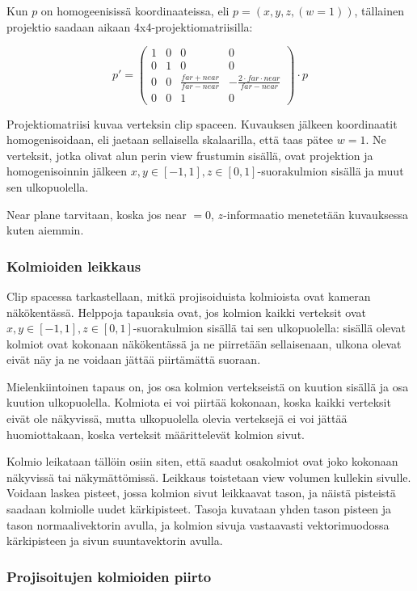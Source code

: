 \documentclass[12pt] {article}
\begin{document}
Kun $p$ on homogeenisissä koordinaateissa, eli $p = (x, y, z, (w = 1))$, tällainen projektio saadaan aikaan 4x4-projektiomatriisilla:

\[
	p' = \begin{pmatrix}
	1 & 0 & 0 & 0 \\
	0 & 1 & 0 & 0 \\
	0 & 0 & \frac{far+near}{far-near} & -\frac{2 \cdot far \cdot near}{far-near} \\
	0 & 0 & 1 & 0
	\end{pmatrix} \cdot p
\]

Projektiomatriisi kuvaa verteksin clip spaceen. Kuvauksen jälkeen koordinaatit homogenisoidaan, eli jaetaan sellaisella skalaarilla, että taas pätee $w = 1$. Ne verteksit, jotka olivat alun perin view frustumin sisällä, ovat projektion ja homogenisoinnin jälkeen $x, y \in [-1, 1], z \in [0, 1]$-suorakulmion sisällä ja muut sen ulkopuolella.

Near plane tarvitaan, koska jos near $= 0$, $z$-informaatio menetetään kuvauksessa kuten aiemmin.

\subsubsection {Kolmioiden leikkaus}

Clip spacessa tarkastellaan, mitkä projisoiduista kolmioista ovat kameran näkökentässä. Helppoja tapauksia ovat, jos kolmion kaikki verteksit ovat $x, y \in [-1, 1], z \in [0, 1]$-suorakulmion sisällä tai sen ulkopuolella: sisällä olevat kolmiot ovat kokonaan näkökentässä ja ne piirretään sellaisenaan, ulkona olevat eivät näy ja ne voidaan jättää piirtämättä suoraan.

Mielenkiintoinen tapaus on, jos osa kolmion vertekseistä on kuution sisällä ja osa kuution ulkopuolella. Kolmiota ei voi piirtää kokonaan, koska kaikki verteksit eivät ole näkyvissä, mutta ulkopuolella olevia verteksejä ei voi jättää huomiottakaan, koska verteksit määrittelevät kolmion sivut.

Kolmio leikataan tällöin osiin siten, että saadut osakolmiot ovat joko kokonaan näkyvissä tai näkymättömissä. Leikkaus toistetaan view volumen kullekin sivulle. Voidaan laskea pisteet, jossa kolmion sivut leikkaavat tason, ja näistä pisteistä saadaan kolmiolle uudet kärkipisteet. Tasoja kuvataan yhden tason pisteen ja tason normaalivektorin avulla, ja kolmion sivuja vastaavasti vektorimuodossa kärkipisteen ja sivun suuntavektorin avulla.

\subsubsection {Projisoitujen kolmioiden piirto}
\end{document}
